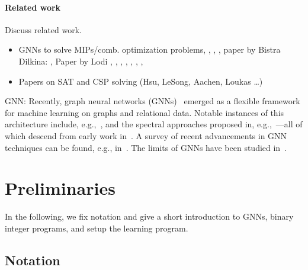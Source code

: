 \documentclass[11pt, DIV=12]{scrartcl}
\theoremstyle{definition}
\begin{document}
\paragraph{Related work} Discuss related work.
\begin{itemize}
	\item GNNs to solve MIPs/comb. optimization problems, \cite{Li+2018b}, \cite{Vel+2020}, \cite{Gas+2019} \cite{Gup+2020} \cite{Kha+2016}, paper by Bistra Dilkina: \cite{Fer+2020} \cite{Son+2020} \cite{Wil+2019} \cite{Kha+2016b}, Paper by Lodi \cite{Ben+2018}, \cite{Lar+2018}, \cite{Bon+2018}, \cite{Ben+2019}, \cite{Fis+2019}, \cite{Gup+2020}, \cite{Zar+2020},	
	
	
	\item Papers on SAT and CSP solving (Hsu, LeSong, Aachen, Loukas \dots) \cite{Sel+2019}
\end{itemize}
 

GNN: Recently, graph neural networks (GNNs)~\cite{Gil+2017,Sca+2009} emerged as a flexible framework for machine learning on graphs and relational data. Notable instances of this architecture include, e.g.,~\cite{Duv+2015,Ham+2017,Vel+2018}, and the spectral approaches proposed in, e.g.,~\cite{Bru+2014,Def+2015,Kip+2017,Mon+2017}---all of which descend from early work in~\cite{Kir+1995,Mer+2005,Spe+1997,Sca+2009}. A survey of recent advancements in GNN techniques can be found, e.g., in~\cite{Cha+2020,Wu+2019,Zho+2018}. The limits of GNNs have been studied in~\cite{Bar+2020,Che+2019,Mae+2019,Mar+2019,Mor+2019,Xu+2018b}.


\section{Preliminaries}

In the following, we fix notation and give a short introduction to GNNs, binary integer programs, and setup the learning program.

\subsection{Notation}
\end{document}
